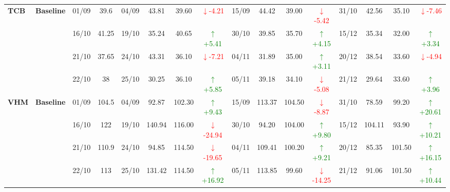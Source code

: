 {\begin{longtable}{llcc|cccc|cccc|cccc}
\multirow{4}{*}{\textbf{TCB}}
& \textbf{Baseline}
& 01/09 & 39.6 & 04/09 & 43.81 & 39.60 & \textcolor{red}{\(\downarrow\)-4.21} & 15/09 & 44.42 & 39.00 & \textcolor{red}{\(\downarrow\)-5.42} & 31/10 & 42.56 & 35.10 & \textcolor{red}{\(\downarrow\)-7.46} \\
& & 16/10 & 41.25 & 19/10 & 35.24 & 40.65 & \textcolor{green}{\(\uparrow\)+5.41} & 30/10 & 39.85 & 35.70 & \textcolor{green}{\(\uparrow\)+4.15} & 15/12 & 35.34 & 32.00 & \textcolor{green}{\(\uparrow\)+3.34} \\
& & 21/10 & 37.65 & 24/10 & 43.31 & 36.10 & \textcolor{red}{\(\downarrow\)-7.21} & 04/11 & 31.89 & 35.00 & \textcolor{green}{\(\uparrow\)+3.11} & 20/12 & 38.54 & 33.60 & \textcolor{red}{\(\downarrow\)-4.94} \\
& & 22/10 & 38 & 25/10 & 30.25 & 36.10 & \textcolor{green}{\(\uparrow\)+5.85} & 05/11 & 39.18 & 34.10 & \textcolor{red}{\(\downarrow\)-5.08} & 21/12 & 29.64 & 33.60 & \textcolor{green}{\(\uparrow\)+3.96} \\
\midrule

\multirow{4}{*}{\textbf{VHM}}
& \textbf{Baseline}
& 01/09 & 104.5 & 04/09 & 92.87 & 102.30 & \textcolor{green}{\(\uparrow\)+9.43} & 15/09 & 113.37 & 104.50 & \textcolor{red}{\(\downarrow\)-8.87} & 31/10 & 78.59 & 99.20 & \textcolor{green}{\(\uparrow\)+20.61} \\
& & 16/10 & 122 & 19/10 & 140.94 & 116.00 & \textcolor{red}{\(\downarrow\)-24.94} & 30/10 & 94.20 & 104.00 & \textcolor{green}{\(\uparrow\)+9.80} & 15/12 & 104.11 & 93.90 & \textcolor{green}{\(\uparrow\)+10.21} \\
& & 21/10 & 110.9 & 24/10 & 94.85 & 114.50 & \textcolor{red}{\(\downarrow\)-19.65} & 04/11 & 109.41 & 100.20 & \textcolor{green}{\(\uparrow\)+9.21} & 20/12 & 85.35 & 101.50 & \textcolor{green}{\(\uparrow\)+16.15} \\
& & 22/10 & 113 & 25/10 & 131.42 & 114.50 & \textcolor{green}{\(\uparrow\)+16.92} & 05/11 & 113.85 & 99.60 & \textcolor{red}{\(\downarrow\)-14.25} & 21/12 & 91.06 & 101.50 & \textcolor{green}{\(\uparrow\)+10.44} \\
\midrule


\end{longtable}}
